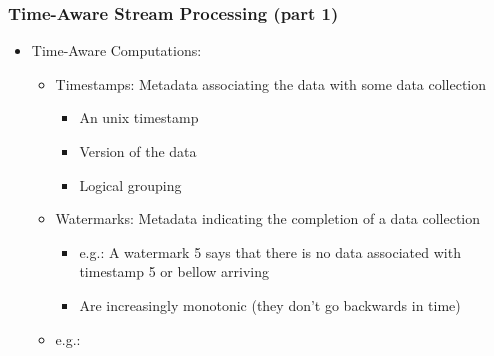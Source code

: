 \documentclass[aspectratio=169,10pt]{beamer}
\begin{document}
\begin{frame}[fragile]
  \frametitle{Time-Aware Stream Processing (part 1)}
  \begin{itemize}
    \item Time-Aware Computations:
          \begin{itemize}
            \item Timestamps: Metadata associating the data with some data collection
                  \begin{itemize}
                    \item An unix timestamp
                    \item Version of the data
                    \item Logical grouping
                  \end{itemize}
            \item Watermarks: Metadata indicating the completion of a data collection
                  \begin{itemize}
                    \item e.g.: A watermark 5 says that there is no data associated with timestamp 5 or bellow arriving
                    \item Are increasingly monotonic (they don't go backwards in time)
                  \end{itemize}
            \item e.g.:
  \begin{figure}[!t]
      \raggedright
    \end{figure}
          \end{itemize}
  \end{itemize}
\end{frame}
\end{document}
